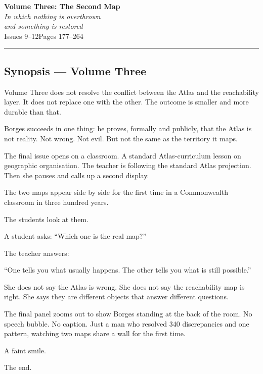 \documentclass[11pt, letterpaper]{article}
\newenvironment{action}{%
  \begin{onehalfspace}\noindent
}{%
  \end{onehalfspace}
}
\newcounter{panelcount}
\newcommand{\issuetitle}[3]{%
  \newpage
  \thispagestyle{empty}
  \vspace*{3cm}
  \begin{center}
    {\color{atlasblue}\Huge\bfseries #1}\\[0.8em]
    {\large\itshape #2}\\[2em]
    {\normalsize\color{notegray} #3}
  \end{center}
  \vspace{2cm}
  \hrule
  \newpage
  \setcounter{panelcount}{0}
}
\begin{document}
\newpage


\issuetitle
  {Volume Three: The Second Map}
  {In which nothing is overthrown\\
  and something is restored}
  {Issues 9–12\quad Pages 177–264}

\subsection*{Synopsis — Volume Three}

\begin{action}
Volume Three does not resolve the conflict between the Atlas and the
reachability layer. It does not replace one with the other. The outcome is
smaller and more durable than that.

Borges succeeds in one thing: he proves, formally and publicly, that the Atlas
is not reality. Not wrong. Not evil. But not the same as the territory it maps.

The final issue opens on a classroom. A standard Atlas-curriculum lesson on
geographic organisation. The teacher is following the standard Atlas projection.
Then she pauses and calls up a second display.

The two maps appear side by side for the first time in a Commonwealth
classroom in three hundred years.

The students look at them.

A student asks: ``Which one is the real map?''

The teacher answers:

``One tells you what usually happens. The other tells you what is still
possible.''

She does not say the Atlas is wrong. She does not say the reachability map
is right. She says they are different objects that answer different questions.

The final panel zooms out to show Borges standing at the back of the room.
No speech bubble. No caption. Just a man who resolved 340 discrepancies and
one pattern, watching two maps share a wall for the first time.

A faint smile.

The end.
\end{action}

\newpage
\end{document}
